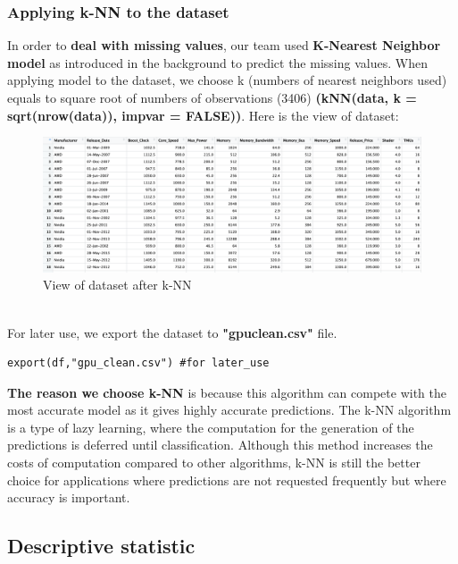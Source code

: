 \documentclass[a4paper]{article}
\theoremstyle{definition}
\begin{document}
\subsubsection{Applying k-NN to the dataset}
In order to \textbf{deal with missing values}, our team used \textbf{K-Nearest Neighbor model} as introduced in the background to predict the missing values. When applying model to the dataset, we choose k (numbers of nearest neighbors used) equals to square root of numbers of observations (3406) \textbf{(kNN(data, k = sqrt(nrow(data)), imp\textunderscore var = FALSE))}. Here is the view of dataset:
\begin{figure}[h!]
\begin{center}
\includegraphics[width=16cm]{images/1.png}
\end{center}
\caption{View of dataset after k-NN}
\end{figure}
\\
For later use, we export the dataset to \textbf{"gpu\textunderscore clean.csv"} file.
\begin{mdframed}[leftline=false,rightline=false,backgroundcolor=lightblue!10,nobreak=false]
    \begin{verbatim}
export(df,"gpu_clean.csv") #for later_use
    \end{verbatim}
\end{mdframed}
\textbf{The reason we choose k-NN} is because this algorithm can compete with the most accurate model as it gives highly accurate predictions. The k-NN algorithm is a type of lazy learning, where the computation for the generation of the predictions is deferred until classification. Although this method increases the costs of computation compared to other algorithms, k-NN is still the better choice for applications where predictions are not requested frequently but where accuracy is important.
\subsection{Descriptive statistic}
\end{document}
